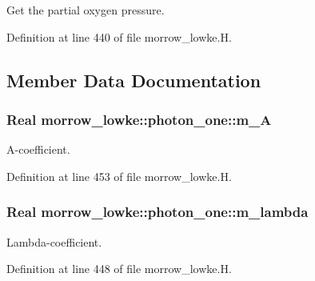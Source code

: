 Get the partial oxygen pressure. 



Definition at line 440 of file morrow\+\_\+lowke.\+H.



\subsection{Member Data Documentation}
\subsubsection[{\texorpdfstring{m\+\_\+A}{m_A}}]{\setlength{\rightskip}{0pt plus 5cm}Real morrow\+\_\+lowke\+::photon\+\_\+one\+::m\+\_\+A\hspace{0.3cm}{\ttfamily [protected]}}\hypertarget{classmorrow__lowke_1_1photon__one_ae20d04a943d212b5f8ecee467f877ca6}{}\label{classmorrow__lowke_1_1photon__one_ae20d04a943d212b5f8ecee467f877ca6}


A-\/coefficient. 



Definition at line 453 of file morrow\+\_\+lowke.\+H.

\subsubsection[{\texorpdfstring{m\+\_\+lambda}{m_lambda}}]{\setlength{\rightskip}{0pt plus 5cm}Real morrow\+\_\+lowke\+::photon\+\_\+one\+::m\+\_\+lambda\hspace{0.3cm}{\ttfamily [protected]}}\hypertarget{classmorrow__lowke_1_1photon__one_ac19677d23be4c09cbce0fd22d08d3136}{}\label{classmorrow__lowke_1_1photon__one_ac19677d23be4c09cbce0fd22d08d3136}


Lambda-\/coefficient. 



Definition at line 448 of file morrow\+\_\+lowke.\+H.

